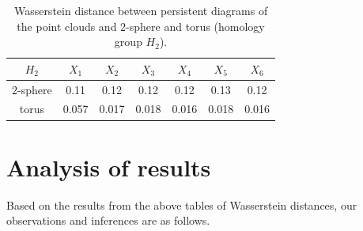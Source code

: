 \begin{table}[!htbp]
        \centering
        \small
        \setlength\tabcolsep{5pt}
        \begin{tabular}{|c|c|c|c|c|c|c|}
\hline
$H_2$ & $X_1$ & $X_2$ & $X_3$ & $X_4$ & $X_5$ & $X_6$ \\ \hline
$2$-sphere & 0.11 &   0.12 & 0.12 & 0.12 & 0.13 & 0.12\\\hline
torus & 0.057 & 0.017 & 0.018  & 0.016 & 0.018 & 0.016 \\ \hline
\end{tabular}
\caption{Wasserstein distance between persistent diagrams of the point clouds and $2$-sphere and torus (homology group $H_2$).}
\label{tab:sphere-H2}
\end{table}

\section{Analysis of results}
Based on the results from the above tables of Wasserstein distances, our observations and inferences are as follows.


